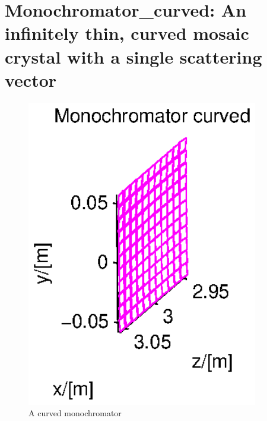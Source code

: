 
\section{Monochromator\_curved: An infinitely thin, curved mosaic crystal with
a single scattering vector}
\label{s:monochromator_curved}


\begin{figure}
  \begin{center}
    \includegraphics[width=0.9\textwidth]{figures/monochromator_curved.eps}
  \end{center}
\caption{A curved monochromator}
\label{f:monochromator_curved}
\end{figure}


